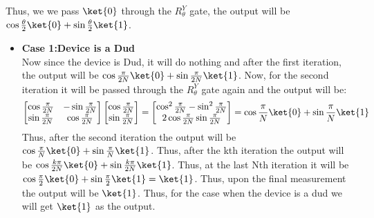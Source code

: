\documentclass[12pt, oneside]{book}
\theoremstyle{definition}
\theoremstyle{definition}
\theoremstyle{remark}
\begin{document}
    Thus, we we pass $\ket{0}$ through the $R^Y_{\theta}$ gate, the output will be $\cos\frac{\theta}{2}\ket{0}+\sin\frac{\theta}{2}\ket{1}$. 
    \begin{itemize}
        \item \textbf{Case 1:Device is a Dud}\\
        Now since the device is Dud, it will do nothing and after the first iteration, the output will be $\cos\frac{\pi}{2N}\ket{0}+\sin\frac{\pi}{2N}\ket{1}$.
        Now, for the second iteration it will be passed through the $R^Y_{\theta}$ gate again and the output will be:
        \[\begin{bmatrix}
            \cos\frac{\pi}{2N} & -\sin\frac{\pi}{2N} \\
            \sin\frac{\pi}{2N} & \cos\frac{\pi}{2N} \\
        \end{bmatrix}\begin{bmatrix}
            \cos\frac{\pi}{2N} \\
            \sin\frac{\pi}{2N} \\
        \end{bmatrix}=\begin{bmatrix}
            \cos^2\frac{\pi}{2N}-\sin^2\frac{\pi}{2N} \\
            2\cos\frac{\pi}{2N}\sin\frac{\pi}{2N} \\
        \end{bmatrix}=\cos\frac{\pi}{N}\ket{0}+\sin\frac{\pi}{N}\ket{1}\]
        Thus, after the second iteration the output will be $\cos\frac{\pi}{N}\ket{0}+\sin\frac{\pi}{N}\ket{1}$.
        Thus, after the kth iteration the output will be $\cos \frac{k\pi}{2N}\ket{0}+\sin \frac{k\pi}{2N}\ket{1}$.
        Thus, at the last Nth iteration it will be $\cos \frac{\pi}{2}\ket{0}+\sin \frac{\pi}{2}\ket{1}=\ket{1}$. Thus, upon the final measurement 
        the output will be $\ket{1}$. Thus, for the case when the device is a dud we will get $\ket{1}$ as the output.


\end{itemize}
\end{document}
